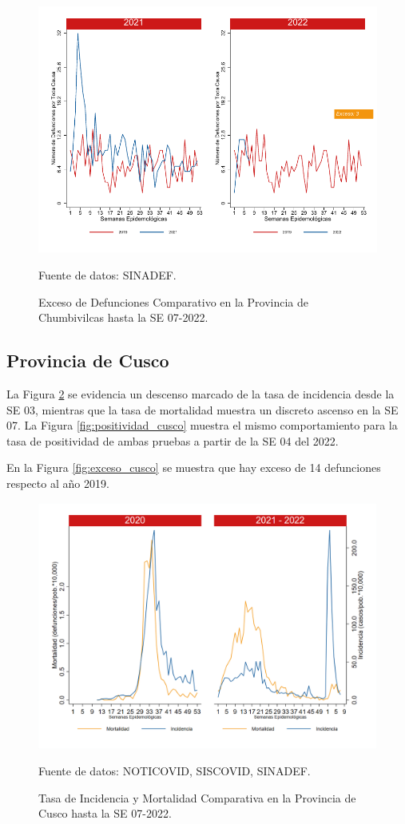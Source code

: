 \documentclass[12pt,a4paper,openany]{book}
\begin{document}
		\begin{figure}[h]
			\caption{Exceso de Defunciones Comparativo en la Provincia de Chumbivilcas hasta la SE 07-2022.}\label{fig:exceso_chumbivilcas}
			\begin{center}
				\includegraphics[width=0.7\linewidth]{../figuras/exceso_6.pdf}
			\end{center}
			{\footnotesize {Fuente de datos: SINADEF.}}
		\end{figure}
		
		\clearpage
		
		\subsection*{Provincia de Cusco}
		\noindent La Figura \ref{fig:inc_mort_cusco} se evidencia un descenso marcado de la tasa de incidencia desde la SE 03, mientras que la tasa de mortalidad muestra un discreto ascenso en la SE 07.   
		\noindent La  Figura \ref{fig:positividad_cusco} muestra el mismo comportamiento para la tasa de positividad de ambas pruebas a partir de la SE 04 del 2022. 
	
	En la Figura \ref{fig:exceso_cusco} se muestra que hay exceso de 14 defunciones respecto al año 2019.
		
		\begin{figure}[h]
			\caption{Tasa de Incidencia y Mortalidad Comparativa en la Provincia de Cusco hasta la SE 07-2022.}\label{fig:inc_mort_cusco}
			\begin{center}
				\includegraphics[width=0.85\linewidth]{../figuras/incidencia_mortalidad_20_21_7.png}
			\end{center}
			{\footnotesize {Fuente de datos: NOTICOVID, SISCOVID, SINADEF.}}
		\end{figure}
		
\end{document}
